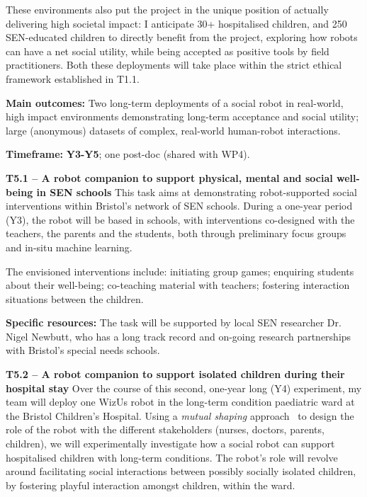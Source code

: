 \documentclass[11pt,a4paper]{report}
\newcommand{\project}{WizUs\xspace}
\begin{document}
These environments also put the project in the unique position of actually
delivering high societal impact: I anticipate 30+ hospitalised children, and 250
SEN-educated children to directly benefit from the project, exploring how robots
can have a net social utility, while being accepted as positive tools by field
practitioners. Both these deployments will take place within the strict ethical
framework established in T1.1.

\begin{framed}

    \textbf{Main outcomes:} Two long-term deployments of a social robot in
    real-world, high impact environments demonstrating long-term acceptance and
    social utility; large (anonymous) datasets of complex, real-world
    human-robot interactions.

    \textbf{Timeframe:} \textbf{Y3-Y5}; one post-doc (shared with WP4).

\end{framed}

\textbf{T5.1 -- A robot companion to support physical, mental and social
well-being in SEN schools} This task aims at demonstrating robot-supported
social interventions within Bristol's network of SEN schools.  During a one-year
period (Y3), the robot will be based in schools, with interventions co-designed
with the teachers, the parents and the students, both through preliminary
focus groups and in-situ machine learning.

The envisioned interventions include: initiating group games; enquiring students
about their well-being; co-teaching material with teachers; fostering
interaction situations between the children.

\textbf{Specific resources:} The task will be supported by local SEN researcher
Dr. Nigel Newbutt, who has a long track record and on-going research
partnerships with Bristol's special needs schools.


\textbf{T5.2 -- A robot companion to support isolated children during their
hospital stay} Over the course of this second, one-year long (Y4)
experiment, my team will deploy one \project robot in the long-term condition
paediatric ward at the Bristol Children's Hospital.  Using a \emph{mutual shaping}
approach~\cite{winkle2018social} to design the role of the robot with the
different stakeholders (nurses, doctors, parents, children), we will
experimentally investigate how a social robot can support hospitalised children
with long-term conditions. The robot's role will revolve around facilitating
social interactions between possibly socially isolated children, by fostering
playful interaction amongst children, within the ward.
\end{document}
